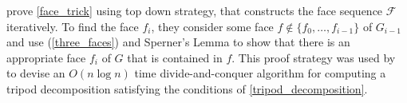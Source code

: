 \documentclass{patmorin}
\begin{document}
\citet{dujmovic.joret.ea:planar} prove \cref{face_trick} using top down strategy, that constructs the face sequence $\mathcal{F}$ iteratively.  To find the face $f_i$, they consider some face $f\not\in\{f_0,\ldots,f_{i-1}\}$ of $G_{i-1}$ and use (\ref{three_faces}) and Sperner's Lemma to show that there is an appropriate face $f_i$ of $G$ that is contained in $f$.  This proof strategy was used by \citet{morin:fast} to devise an $O(n\log n)$ time divide-and-conquer algorithm for computing a tripod decomposition satisfying the conditions of \cref{tripod_decomposition}.







\end{document}
